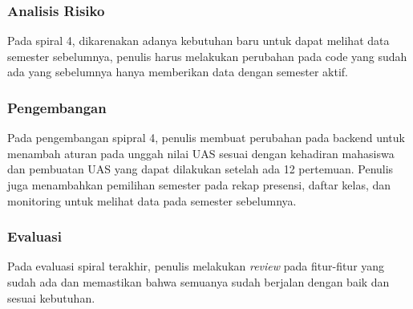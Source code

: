 \subsubsection{Analisis Risiko}
	Pada spiral 4, dikarenakan adanya kebutuhan baru untuk dapat melihat data semester sebelumnya, penulis harus melakukan perubahan pada code yang sudah ada yang sebelumnya hanya memberikan data dengan semester aktif.
\subsubsection{Pengembangan}
	Pada pengembangan spipral 4, penulis membuat perubahan pada backend untuk menambah aturan pada unggah nilai UAS sesuai dengan kehadiran mahasiswa dan pembuatan UAS yang dapat dilakukan setelah ada 12 pertemuan. Penulis juga menambahkan pemilihan semester pada rekap presensi, daftar kelas, dan monitoring untuk melihat data pada semester sebelumnya. 
\subsubsection{Evaluasi}
	Pada evaluasi spiral terakhir, penulis melakukan \textit{review} pada fitur-fitur yang sudah ada dan memastikan bahwa semuanya sudah berjalan dengan baik dan sesuai kebutuhan.










